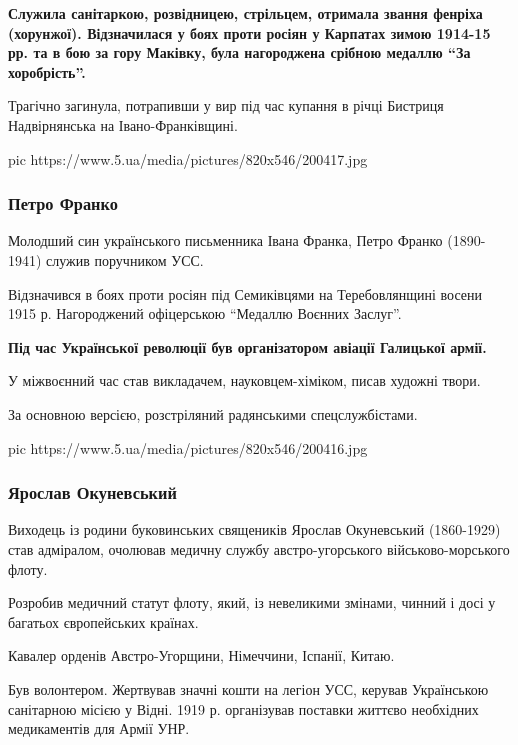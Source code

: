 \begin{leftbar}
	\bfseries
Служила санітаркою, розвідницею, стрільцем, отримала звання фенріха
(хорунжої). Відзначилася у боях проти росіян у Карпатах зимою 1914-15
рр. та в бою за гору Маківку, була нагороджена срібною медаллю \enquote{За
хоробрість}.
\end{leftbar}

Трагічно загинула, потрапивши у вир під час купання в річці Бистриця
Надвірнянська на Івано-Франківщині.

\ifcmt
pic https://www.5.ua/media/pictures/820x546/200417.jpg
\fi

\subsubsection{Петро Франко}


Молодший син українського письменника Івана Франка, Петро Франко
(1890-1941) служив поручником УСС.

Відзначився в боях проти росіян під Семиківцями на Теребовлянщині восени
1915 р. Нагороджений офіцерською \enquote{Медаллю Воєнних Заслуг}.

\begin{leftbar}
	\bfseries
Під час Української революції був організатором авіації Галицької армії.
\end{leftbar}

У міжвоєнний час став викладачем, науковцем-хіміком, писав художні твори.

За основною версією, розстріляний радянськими спецслужбістами.

\ifcmt
pic https://www.5.ua/media/pictures/820x546/200416.jpg
\fi

\subsubsection{Ярослав Окуневський}

Виходець із родини буковинських священиків Ярослав Окуневський (1860-1929)
став адміралом, очолював медичну службу австро-угорського
військово-морського флоту.

Розробив медичний статут флоту, який, із невеликими змінами, чинний і
досі у багатьох європейських країнах.

Кавалер орденів Австро-Угорщини, Німеччини, Іспанії, Китаю.

Був волонтером. Жертвував значні кошти на легіон УСС, керував Українською
санітарною місією у Відні. 1919 р. організував поставки життєво необхідних
медикаментів для Армії УНР.

